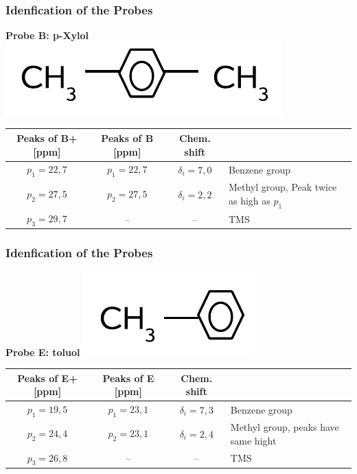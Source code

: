 \documentclass[aspectratio=169]{beamer}
\begin{document}
\begin{frame}
\frametitle{Idenfication of the Probes}
\begin{center}
\textbf{Probe B: p-Xylol} \includegraphics[height = 0.6 cm]{./Resources/p-xylol.png}
\end{center}

\begin{table}[!htb]
\centering
\begin{tabularx}{0.92\linewidth}{cccX}
\toprule
Peaks of B+ [ppm] & Peaks of B [ppm] & Chem. shift &  \\
\midrule
$p_1 = 22,7$ & $p_1 = 22,7$ & $\delta_i = 7,0$ & Benzene group \\

$p_2 = 27,5$ & $p_2 = 27,5$ & $\delta_i = 2,2$ & Methyl group, Peak twice as high as $p_1$ \\

$p_3 = 29,7$ & -- & --  & TMS \\

\bottomrule
\end{tabularx}
\end{table}	

\end{frame}

\begin{frame}
\frametitle{Idenfication of the Probes}
\begin{center}
\textbf{Probe E: toluol} \includegraphics[height = 0.6 cm]{./Resources/toluol.png}
\end{center}

\begin{table}[!htb]
\centering
\begin{tabularx}{.92\linewidth}{cccX}
\toprule
Peaks of E+ [ppm] & Peaks of E [ppm] & Chem. shift &  \\
\midrule
$p_1 = 19,5$ & $p_1 = 23,1$ & $\delta_i = 7,3 $ & Benzene group \\

$p_2 = 24,4$ & $p_2 = 23,1$ & $\delta_i = 2,4$ & Methyl group, peaks have same hight \\

$p_3 = 26,8$ & -- & -- & TMS \\

\bottomrule
\end{tabularx}
\end{table}

\end{frame}
\end{document}
